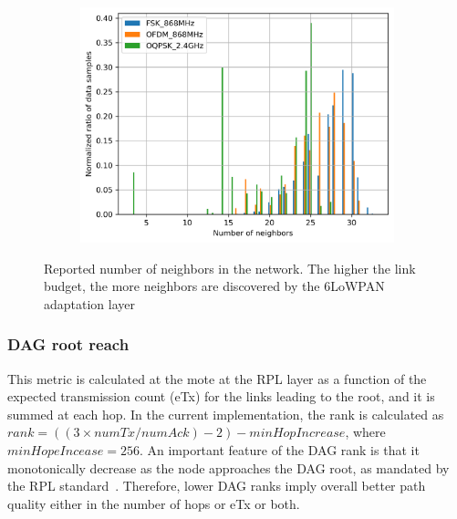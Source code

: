 \documentclass[journal]{IEEEtran}
\begin{document}
\begin{figure}
\begin{subfigure}{0.6\columnwidth}
		\centering
	\includegraphics[width=1\columnwidth]{neighbors_pdf}
	\label{fig:neighbors_pdf}
	\end{subfigure}%

	\caption{Reported number of neighbors in the network. The higher the link budget, the more neighbors are discovered by the 6LoWPAN adaptation layer} 
	\label{fig:neighbors_all}
\end{figure}

\subsubsection{DAG root reach}
\label{sec:dagroot}


This metric is calculated at the mote at the RPL layer as a function of the expected transmission count (eTx) for the links leading to the root, and it is summed at each hop.
In the current implementation, the rank is calculated as $rank = ((3\times numTx/numAck)-2)-minHopIncrease$, where $minHopeIncease = 256$. 
An important feature of the DAG rank is that it monotonically decrease as  the node approaches the DAG root, as mandated by the RPL standard~\cite{t.wintered.12rpl}.
Therefore, lower DAG ranks imply overall better path quality either in the number of hops or eTx or both. 

\end{document}
